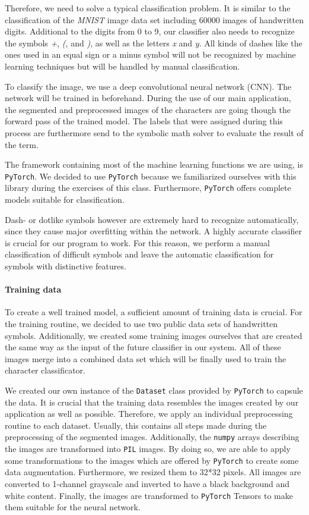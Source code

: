 \documentclass[12pt]{article}
\begin{document}
	Therefore, we need to solve a typical classification problem. It is similar to the classification of the \textit{MNIST} image data set including 60000 images of handwritten digits. Additional to the digits from 0 to 9, our classifier also needs to recognize the symbols \textit{+}, \textit{(}, and \textit{)}, as well as the letters \textit{x} and \textit{y}. All kinds of dashes like the ones used in an equal sign or a minus symbol will not be recognized by machine learning techniques but will be handled by manual classification.
	
	To classify the image, we use a deep convolutional neural network (CNN). The network will be trained in beforehand. During the use of our main application, the segmented and preprocessed images of the characters are going though the forward pass of the trained model. The labels that were assigned during this process are furthermore send to the symbolic math solver to evaluate the result of the term. 
	
	The framework containing most of the machine learning functions we are using, is \texttt{PyTorch}. We decided to use \texttt{PyTorch} because we familiarized ourselves with this library during the exercises of this class. Furthermore, \texttt{PyTorch} offers complete models suitable for classification.
		
	Dash- or dotlike symbols however are extremely hard to recognize automatically, since they cause major overfitting within the network. A highly accurate classifier is crucial for our program to work. For this reason, we perform a manual classification of difficult symbols and leave the automatic classification for symbols with distinctive features.
	
	\paragraph{Training data}
		To create a well trained model, a sufficient amount of training data is crucial. For the training routine, we decided to use two public data sets of handwritten symbols. Additionally, we created some training images ourselves that are created the same way as the input of the future classifier in our system. All of these images merge into a combined data set which will be finally used to train the character classificator.
		
		We created our own instance of the \texttt{Dataset} class provided by \texttt{PyTorch} to capsule the data. It is crucial that the training data resembles the images created by our application as well as possible. Therefore, we apply an individual preprocessing routine to each dataset. Usually, this contains all steps made during the preprocessing of the segmented images. Additionally, the \texttt{numpy} arrays describing the images are transformed into \texttt{PIL} images. By doing so, we are able to apply some transformations to the images which are offered by \texttt{PyTorch} to create some data augmentation. Furthermore, we resized them to 32*32 pixels. All images are converted to 1-channel grayscale and inverted to have a black background and white content. Finally, the images are transformed to \texttt{PyTorch} Tensors to make them suitable for the neural network. 
		
\end{document}
